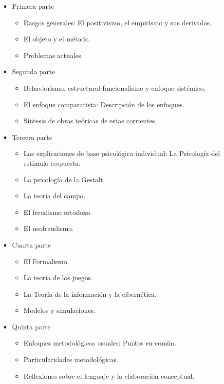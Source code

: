 \documentclass[
]{book}
\providecommand{\tightlist}{%
  \setlength{\itemsep}{0pt}\setlength{\parskip}{0pt}}
\begin{document}
\begin{itemize}
\tightlist
\item
  Primera parte

  \begin{itemize}
  \tightlist
  \item
    Rasgos generales: El positivismo, el empirismo y sus derivados.
  \item
    El objeto y el método.
  \item
    Problemas actuales.
  \end{itemize}
\item
  Segunda parte

  \begin{itemize}
  \tightlist
  \item
    Behaviorismo, estructural-funcionalismo y enfoque sistémico.
  \item
    El enfoque comparatista: Descripción de los enfoques.
  \item
    Síntesis de obras teóricas de estas corrientes.
  \end{itemize}
\item
  Tercera parte

  \begin{itemize}
  \tightlist
  \item
    Las explicaciones de base psicológica individual: La Psicología del estímulo-respuesta.
  \item
    La psicología de la Gestalt.
  \item
    La teoría del campo.
  \item
    El freudismo ortodoxo.
  \item
    El neofreudismo.
  \end{itemize}
\item
  Cuarta parte

  \begin{itemize}
  \tightlist
  \item
    El Formalismo.
  \item
    La teoría de los juegos.
  \item
    La Teoría de la información y la cibernética.
  \item
    Modelos y simulaciones.
  \end{itemize}
\item
  Quinta parte

  \begin{itemize}
  \tightlist
  \item
    Enfoques metodológicos usuales: Puntos en común.
  \item
    Particularidades metodológicas.
  \item
    Reflexiones sobre el lenguaje y la elaboración conceptual.
  \end{itemize}
\end{itemize}
\end{document}
